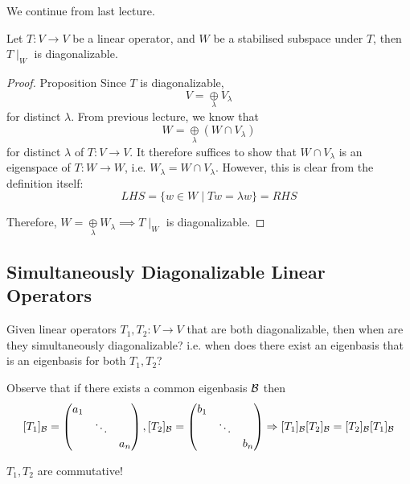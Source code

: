 
We continue from last lecture.
\begin{proposition}
    Let \(T: V \to V\) be a linear operator, and \(W\) be a stabilised subspace under \(T\), then \(T\mid_W\) is diagonalizable.
\end{proposition}

\begin{proof} {Proposition}
    Since \(T\) is diagonalizable, \[
        V = \underset{\lambda}{\oplus} V_{\lambda}
    \] for distinct \(\lambda\). From previous lecture, we know that \[
        W = \underset{\lambda}{\oplus} (W \cap V_\lambda)
    \] for distinct \(\lambda\) of \(T: V \to V\). It therefore suffices to show that \(W \cap V_\lambda\) is an eigenspace of \(T: W \to W\), i.e. \(W_\lambda = W \cap V_\lambda\). However, this is clear from the definition itself: \[
        LHS = \{w \in W \mid Tw = \lambda w\} = RHS
    \]

    Therefore, \( W = \underset{\lambda}{\oplus} W_\lambda \implies T\mid_W\) is diagonalizable.
\end{proof}

\subsection{Simultaneously Diagonalizable Linear Operators}
\begin{question}
    Given linear operators \(T_1, T_2: V \to V\) that are both diagonalizable, then when are they simultaneously diagonalizable? i.e. when does there exist an eigenbasis that is an eigenbasis for both \(T_1, T_2\)?
\end{question}

Observe that if there exists a common eigenbasis \(\mathcal{B}\) then \[
    [T_1]_{\mathcal{B}} = \begin{pmatrix}
        a_1 &        &     \\
            & \ddots &     \\
            &        & a_n
    \end{pmatrix}, [T_2]_{\mathcal{B}} = \begin{pmatrix}
        b_1 &        &     \\
            & \ddots &     \\
            &        & b_n
    \end{pmatrix}
    \Rightarrow [T_1]_{\mathcal{B}} [T_2]_{\mathcal{B}} = [T_2]_{\mathcal{B}} [T_1]_{\mathcal{B}}
\]

\(T_1, T_2\) are commutative!


